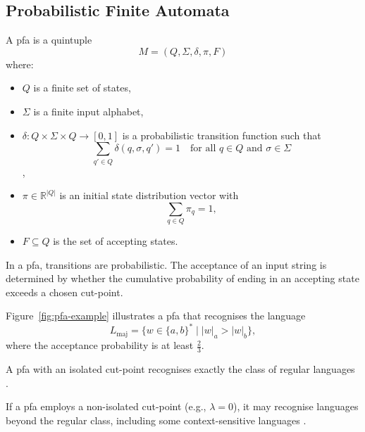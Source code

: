 \subsection{Probabilistic Finite Automata}
\label{subsec:pfa}

\begin{definition}
    A \gls{pfa} is a quintuple 
    \[
    M = (Q, \Sigma, \delta, \pi, F)
    \]
    where:
    \begin{itemize}
        \item \( Q \) is a finite set of states,
        \item \( \Sigma \) is a finite input alphabet,
        \item \( \delta: Q \times \Sigma \times Q \rightarrow [0,1] \) is a probabilistic transition function such that 
        \[
        \sum_{q' \in Q} \delta(q, \sigma, q') = 1 \quad \text{for all } q \in Q \text{ and } \sigma \in \Sigma
        \]\cite{rabin1963probabilistic},
        \item \( \pi \in \mathbb{R}^{|Q|} \) is an initial state distribution vector with 
        \[
        \sum_{q \in Q} \pi_q = 1,
        \]
        \item \( F \subseteq Q \) is the set of accepting states.
    \end{itemize}
\end{definition}

\begin{remark}
In a \gls{pfa}, transitions are probabilistic. The acceptance of an input string is determined by whether the cumulative probability of ending in an accepting state exceeds a chosen cut-point.
\end{remark}

\begin{example}
Figure~\ref{fig:pfa-example} illustrates a \gls{pfa} that recognises the language 
\[
L_{\text{maj}} = \{ w \in \{a,b\}^* \mid |w|_a > |w|_b \},
\]
where the acceptance probability is at least \( \frac{2}{3} \).
\end{example}

\begin{theorem}
    \label{thm:rabin}
    A \gls{pfa} with an isolated cut-point recognises exactly the class of regular languages \cite{rabin1963probabilistic}.
\end{theorem}

\begin{proposition}
    If a \gls{pfa} employs a non-isolated cut-point (e.g., \(\lambda = 0\)), it may recognise languages beyond the regular class, including some context-sensitive languages \cite{paz1971introduction}.
\end{proposition}


